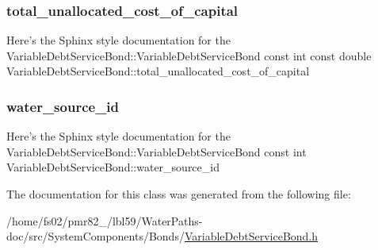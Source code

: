 \subsubsection{\texorpdfstring{total\+\_\+unallocated\+\_\+cost\+\_\+of\+\_\+capital}{total\_unallocated\_cost\_of\_capital}}
{\footnotesize\ttfamily Here’s the Sphinx style documentation for the Variable\+Debt\+Service\+Bond\+::\+Variable\+Debt\+Service\+Bond const int const double Variable\+Debt\+Service\+Bond\+::total\+\_\+unallocated\+\_\+cost\+\_\+of\+\_\+capital}

\mbox{\label{classVariableDebtServiceBond_a1b43195523e5571e04f2ed558497ab6a}} 
\subsubsection{\texorpdfstring{water\+\_\+source\+\_\+id}{water\_source\_id}}
{\footnotesize\ttfamily Here’s the Sphinx style documentation for the Variable\+Debt\+Service\+Bond\+::\+Variable\+Debt\+Service\+Bond const int Variable\+Debt\+Service\+Bond\+::water\+\_\+source\+\_\+id}



The documentation for this class was generated from the following file\+:\begin{DoxyCompactItemize}
\item 
/home/fs02/pmr82\+\_/lbl59/\+Water\+Paths-\/doc/src/\+System\+Components/\+Bonds/\mbox{\hyperlink{VariableDebtServiceBond_8h}{Variable\+Debt\+Service\+Bond.\+h}}\end{DoxyCompactItemize}
